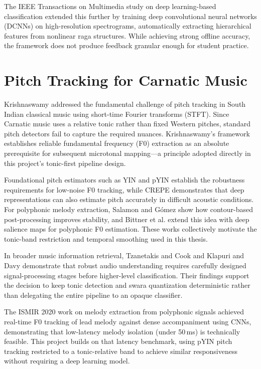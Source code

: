 \documentclass[12pt,a4paper]{report}
\numberwithin{equation}{chapter}
\begin{document}
The IEEE Transactions on Multimedia study on deep learning-based classification \cite{ieee2022deep} extended this further by training deep convolutional neural networks (DCNNs) on high-resolution spectrograms, automatically extracting hierarchical features from nonlinear raga structures. While achieving strong offline accuracy, the framework does not produce feedback granular enough for student practice.

\section{Pitch Tracking for Carnatic Music}
Krishnaswamy \cite{krishnaswamy2018application} addressed the fundamental challenge of pitch tracking in South Indian classical music using short-time Fourier transforms (STFT). Since Carnatic music uses a relative tonic rather than fixed Western pitches, standard pitch detectors fail to capture the required nuances. Krishnaswamy's framework establishes reliable fundamental frequency (F0) extraction as an absolute prerequisite for subsequent microtonal mapping---a principle adopted directly in this project's tonic-first pipeline design.

Foundational pitch estimators such as YIN \cite{decheveigne2002yin} and pYIN \cite{mauch2014pyin} establish the robustness requirements for low-noise F0 tracking, while CREPE \cite{kim2018crepe} demonstrates that deep representations can also estimate pitch accurately in difficult acoustic conditions. For polyphonic melody extraction, Salamon and Gómez \cite{salamon2012melody} show how contour-based post-processing improves stability, and Bittner et al. \cite{bittner2017deepsalience} extend this idea with deep salience maps for polyphonic F0 estimation. These works collectively motivate the tonic-band restriction and temporal smoothing used in this thesis.

In broader music information retrieval, Tzanetakis and Cook \cite{tzanetakis2002genre} and Klapuri and Davy \cite{klapuri2006signal} demonstrate that robust audio understanding requires carefully designed signal-processing stages before higher-level classification. Their findings support the decision to keep tonic detection and swara quantization deterministic rather than delegating the entire pipeline to an opaque classifier.

The ISMIR 2020 work on melody extraction from polyphonic signals \cite{ismir2020melody} achieved real-time F0 tracking of lead melody against dense accompaniment using CNNs, demonstrating that low-latency melody isolation (under 50\,ms) is technically feasible. This project builds on that latency benchmark, using pYIN pitch tracking restricted to a tonic-relative band to achieve similar responsiveness without requiring a deep learning model.
\end{document}
